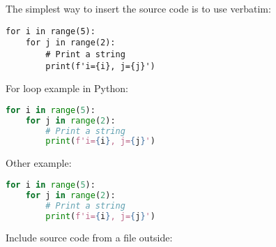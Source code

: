 \documentclass{article}
\begin{document}
The simplest way to insert the source code is to use verbatim:

\begin{verbatim}
for i in range(5):
    for j in range(2):
        # Print a string
        print(f'i={i}, j={j}')
\end{verbatim}



\vspace{10mm} For loop example in Python:

\begin{lstlisting}[language=Python]
for i in range(5):
    for j in range(2):
        # Print a string
        print(f'i={i}, j={j}')
\end{lstlisting}



\vspace{10mm} Other example:

\begin{lstlisting}[language=python, style=mystyle]
for i in range(5):
    for j in range(2):
        # Print a string
        print(f'i={i}, j={j}')
\end{lstlisting}


\vspace{10mm} Include source code from a file outside:


\end{document}
